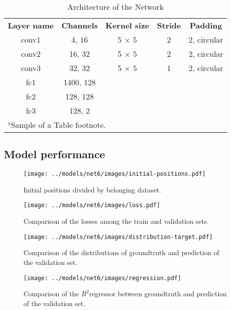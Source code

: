 \documentclass[conference]{IEEEtran}
\begin{document}
\begin{table}[htbp]
	\caption{Architecture of the Network}
	\begin{center}
		\begin{tabular}{|c|c|c|c|c|}
			\hline
			\textbf{Layer name}&\textbf{Channels} &\textbf{Kernel size} &\textbf{Stride} &\textbf{Padding}\\
			\cline{1-5}
			conv1 &  4,  16 & 5 $\times$ 5 & 2 & 2, circular \\ \hline
			conv2 & 16,  32 & 5 $\times$ 5 & 2 & 2, circular \\ \hline
			conv3 & 32,  32 & 5 $\times$ 5 & 1 & 2, circular \\ \hline
			fc1 & 1400, 128 &  &  &  \\ \hline
			fc2 &  128, 128 &  &  &  \\ \hline
			fc3 &  128,   2 &  &  &  \\ \hline
			\multicolumn{5}{l}{$^{\mathrm{a}}$Sample of a Table footnote.}
		\end{tabular}
		\label{tab1}
	\end{center}
\end{table}

\subsection{Model performance}
\begin{figure}[htbp]
	\centerline{\texttt{[image: ../models/net6/images/initial-positions.pdf]}}
	\caption{Initial positions divided by belonging dataset.}
	\label{fig:initial-positions}
\end{figure}

\begin{figure}[htbp]
	\centerline{\texttt{[image: ../models/net6/images/loss.pdf]}}
	\caption{Comparison of the losses among the train and validation sets.}
	\label{fig:loss}
\end{figure}

\begin{figure}[htbp]
	\centerline{\texttt{[image: ../models/net6/images/distribution-target.pdf]}}
	\caption{Comparison of the distributions of groundtruth and prediction of the validation set.}
	\label{fig:distribution-target}
\end{figure}

\begin{figure}[htbp]
	\centerline{\texttt{[image: ../models/net6/images/regression.pdf]}}
	\caption{Comparison of the $R^2$regressor between groundtruth and prediction of the validation set.}
	\label{fig:regression}
\end{figure}
\end{document}

